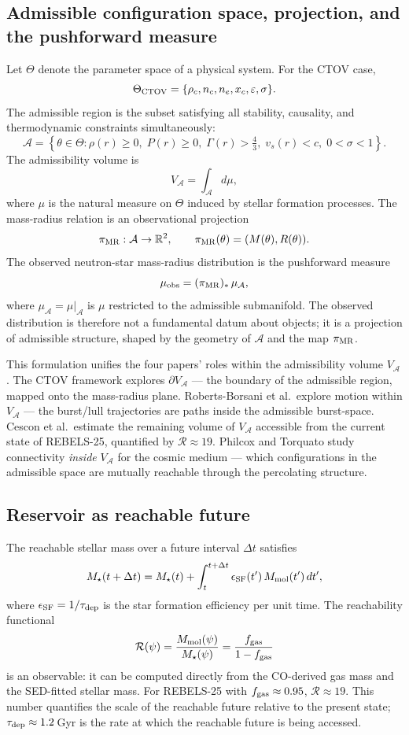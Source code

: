 \documentclass[12pt, oneside]{article}
\begin{document}
\subsection{Admissible configuration space, projection, and the pushforward measure}

Let $\Theta$ denote the parameter space of a physical system. For the CTOV case,
\[
\Theta_{\rm CTOV} = \{\rho_c, n_c, n_e, x_c, \varepsilon, \sigma\}.
\]
The admissible region is the subset satisfying all stability, causality, and thermodynamic constraints simultaneously:
\[
\mathcal{A} = \left\{\theta \in \Theta :
\rho(r) \geq 0,\;
P(r) \geq 0,\;
\Gamma(r) > \tfrac{4}{3},\;
v_s(r) < c,\;
0 < \sigma < 1
\right\}.
\]
The admissibility volume is
\[
V_{\mathcal{A}} = \int_{\mathcal{A}} d\mu,
\]
where $\mu$ is the natural measure on $\Theta$ induced by stellar formation processes. The mass-radius relation is an observational projection
\[
\pi_{\rm MR} : \mathcal{A} \to \mathbb{R}^2, \qquad \pi_{\rm MR}(\theta) = (M(\theta), R(\theta)).
\]
The observed neutron-star mass-radius distribution is the pushforward measure
\[
\mu_{\rm obs} = (\pi_{\rm MR})_*\,\mu_{\mathcal{A}},
\]
where $\mu_{\mathcal{A}} = \mu|_{\mathcal{A}}$ is $\mu$ restricted to the admissible submanifold. The observed distribution is therefore not a fundamental datum about objects; it is a projection of admissible structure, shaped by the geometry of $\mathcal{A}$ and the map $\pi_{\rm MR}$.

This formulation unifies the four papers' roles within the admissibility volume $V_{\mathcal{A}}$. The CTOV framework explores $\partial V_{\mathcal{A}}$ --- the boundary of the admissible region, mapped onto the mass-radius plane. Roberts-Borsani et al.\ explore motion within $V_{\mathcal{A}}$ --- the burst/lull trajectories are paths inside the admissible burst-space. Cescon et al.\ estimate the remaining volume of $V_{\mathcal{A}}$ accessible from the current state of REBELS-25, quantified by $\mathcal{R} \approx 19$. Philcox and Torquato study connectivity \textit{inside} $V_{\mathcal{A}}$ for the cosmic medium --- which configurations in the admissible space are mutually reachable through the percolating structure.

\subsection{Reservoir as reachable future}

The reachable stellar mass over a future interval $\Delta t$ satisfies
\[
M_\star(t + \Delta t) = M_\star(t) + \int_t^{t+\Delta t} \epsilon_{\rm SF}(t')\,M_{\rm mol}(t')\,dt',
\]
where $\epsilon_{\rm SF} = 1/\tau_{\rm dep}$ is the star formation efficiency per unit time. The reachability functional
\[
\mathcal{R}(\psi) = \frac{M_{\rm mol}(\psi)}{M_\star(\psi)} = \frac{f_{\rm gas}}{1 - f_{\rm gas}}
\]
is an observable: it can be computed directly from the CO-derived gas mass and the SED-fitted stellar mass. For REBELS-25 with $f_{\rm gas} \approx 0.95$, $\mathcal{R} \approx 19$. This number quantifies the scale of the reachable future relative to the present state; $\tau_{\rm dep} \approx 1.2$\,Gyr is the rate at which the reachable future is being accessed.
\end{document}
